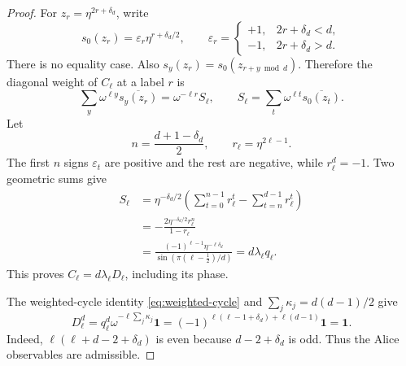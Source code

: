 \documentclass[11pt]{article}
\theoremstyle{remark}
\newcommand{\Id}{\mathbf 1}
\begin{document}
\begin{proof}
For \(z_r=\eta^{2r+\delta_d}\), write
\[
s_0(z_r)
=\varepsilon_r\eta^{r+\delta_d/2},\qquad
\varepsilon_r=
\begin{cases}
+1,&2r+\delta_d<d,\\
-1,&2r+\delta_d>d.
\end{cases}
\]
There is no equality case.  Also
\(s_y(z_r)=s_0(z_{r+y\bmod d})\).  Therefore the diagonal weight of
\(C_\ell\) at a label \(r\) is
\[
\sum_y\omega^{\ell y}\overline{s_y(z_r)}
=
\omega^{-\ell r}S_\ell,
\qquad
S_\ell=
\sum_t\omega^{\ell t}\overline{s_0(z_t)}.
\]
Let
\[
n=\frac{d+1-\delta_d}{2},\qquad
r_\ell=\eta^{2\ell-1}.
\]
The first \(n\) signs \(\varepsilon_t\) are positive and the rest are
negative, while \(r_\ell^d=-1\).  Two geometric sums give
\[
\begin{aligned}
S_\ell
&=\eta^{-\delta_d/2}
\left(\sum_{t=0}^{n-1}r_\ell^t
-\sum_{t=n}^{d-1}r_\ell^t\right)\\
&=-\frac{2\eta^{-\delta_d/2}r_\ell^n}{1-r_\ell}\\
&=
\frac{(-1)^{\ell-1}\eta^{-\ell\delta_d}}
{\sin(\pi(\ell-\tfrac12)/d)}
=d\lambda_\ell q_\ell.
\end{aligned}
\]
This proves \(C_\ell=d\lambda_\ell D_\ell\), including its phase.

The weighted-cycle identity \eqref{eq:weighted-cycle} and
\(\sum_j\kappa_j=d(d-1)/2\) give
\[
D_\ell^d
=
q_\ell^d\omega^{-\ell\sum_j\kappa_j}\Id
=
(-1)^{
\ell(\ell-1+\delta_d)+\ell(d-1)
}\Id
=\Id.
\]
Indeed,
\(\ell(\ell+d-2+\delta_d)\) is even because
\(d-2+\delta_d\) is odd.  Thus the Alice observables are admissible.


\end{proof}
\end{document}
